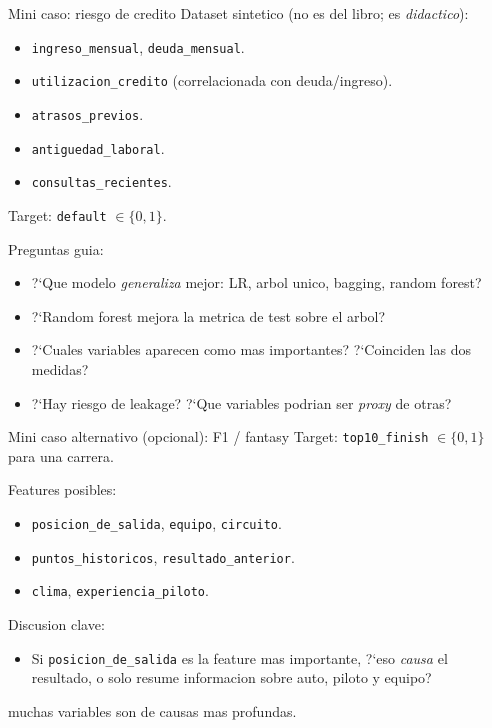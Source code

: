 \begin{frame}{Mini caso: riesgo de credito}
Dataset sintetico (no es del libro; es \emph{didactico}):
\begin{itemize}\small
  \item \texttt{ingreso\_mensual}, \texttt{deuda\_mensual}.
  \item \texttt{utilizacion\_credito} (correlacionada con deuda/ingreso).
  \item \texttt{atrasos\_previos}.
  \item \texttt{antiguedad\_laboral}.
  \item \texttt{consultas\_recientes}.
\end{itemize}

\vspace{0.3em}
Target: \texttt{default} $\in \{0,1\}$.

\vspace{0.3em}
Preguntas guia:
\begin{itemize}\small
  \item ?`Que modelo \emph{generaliza} mejor: LR, arbol unico, bagging, random forest?
  \item ?`Random forest mejora la metrica de test sobre el arbol?
  \item ?`Cuales variables aparecen como mas importantes? ?`Coinciden las dos medidas?
  \item ?`Hay riesgo de leakage? ?`Que variables podrian ser \emph{proxy} de otras?
\end{itemize}
\end{frame}

\begin{frame}{Mini caso alternativo (opcional): F1 / fantasy}
Target: \texttt{top10\_finish} $\in\{0,1\}$ para una carrera.

\vspace{0.3em}
Features posibles:
\begin{itemize}\small
  \item \texttt{posicion\_de\_salida}, \texttt{equipo}, \texttt{circuito}.
  \item \texttt{puntos\_historicos}, \texttt{resultado\_anterior}.
  \item \texttt{clima}, \texttt{experiencia\_piloto}.
\end{itemize}

\vspace{0.3em}
Discusion clave:
\begin{itemize}\small
  \item Si \texttt{posicion\_de\_salida} es la feature mas importante, ?`eso \emph{causa} el resultado, o solo resume informacion sobre auto, piloto y equipo?
\end{itemize}

\vspace{0.3em}
 muchas variables son  de causas mas profundas.
\end{frame}

